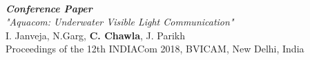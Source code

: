 \documentclass[11pt]{res} %
\newcommand{\titlegap}{5pt} %
\newcommand{\sectgap}{0.05in} %
\begin{document}
\begin{resume}
\\
\textbf{\textit{Conference Paper}}\\ \textit{"Aquacom: Underwater Visible Light Communication"}\\
I. Janveja, N.Garg, \textbf{C. Chawla}, J. Parikh\\
Proceedings of the 12th INDIACom 2018, BVICAM, New Delhi, India


\vspace{\sectgap} 
\hline













\end{resume}
\end{document}
